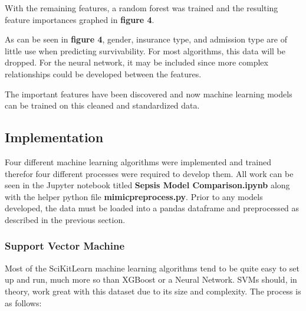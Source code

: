 \documentclass[11pt]{article}
\begin{document}
		With the remaining features, a random forest was trained and the resulting feature importances graphed in \textbf{figure 4}.
		
	
		As can be seen in \textbf{figure 4}, gender, insurance type, and admission type are of little use when predicting survivability. For most algorithms, this data will be dropped. For the neural network, it may be included since more complex relationships could be developed between the features.
	
		The important features have been discovered and now machine learning models can be trained on this cleaned and standardized data.
	
	\subsection{Implementation}
	Four different machine learning algorithms were implemented and trained therefor four different processes were required to develop them. All work can be seen in the Jupyter notebook titled \textbf{Sepsis Model Comparison.ipynb} along with the helper python file \textbf{mimicpreprocess.py}. Prior to any models developed, the data must be loaded into a pandas dataframe and preprocessed as described in the previous section.
	
	\subsubsection{Support Vector Machine}
		Most of the SciKitLearn machine learning algorithms tend to be quite easy to set up and run, much more so than XGBoost or a Neural Network. SVMs should, in theory, work great with this dataset due to its size and complexity. The process is as follows:
		
\end{document}
